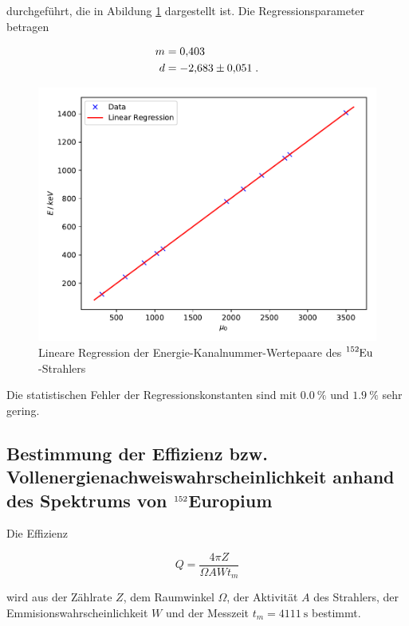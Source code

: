 durchgeführt, die in Abildung \ref{fig:plot5} dargestellt ist.
Die Regressionsparameter betragen

\begin{align*}
  m &= \num{0.403 +- 0.000} \\
  d &= \num{-2.683 +- 0.051} \; .
\end{align*}

\begin{figure}[H]
  \centering
  \includegraphics[scale=0.7]{content/plot5.pdf}
  \caption{Lineare Regression der Energie-Kanalnummer-Wertepaare des $\ce{^{152}Eu}$-Strahlers}
  \label{fig:plot5}
\end{figure}

Die statistischen Fehler der Regressionskonstanten sind mit $\SI{0.0}{\percent}$ und $\SI{1.9}{\percent}$ sehr gering.


\subsection{Bestimmung der Effizienz bzw. Vollenergienachweiswahrscheinlichkeit anhand des Spektrums von $\ce{^{152}}$Europium}

Die Effizienz

\begin{equation}
  Q = \frac{4 \pi Z}{\Omega A W t_m}
  \label{eqn:akt}
\end{equation}

wird aus der Zählrate  $Z$, dem Raumwinkel $\Omega$, der Aktivität $A$ des Strahlers, 
der Emmisionswahrscheinlichkeit $W$ und der Messzeit $t_m = \SI{4111}{\second}$ bestimmt.

